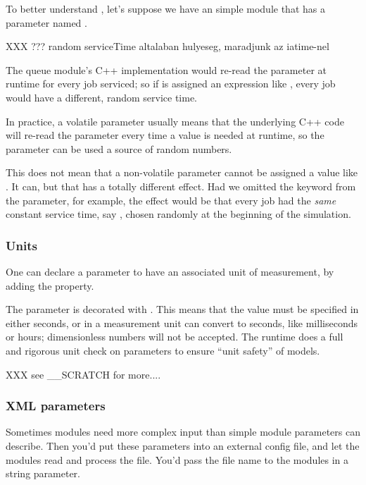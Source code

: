 To better understand , let's suppose we have an
 simple module that has a  parameter
named .

XXX ??? random serviceTime altalaban hulyeseg, maradjunk az iatime-nel

The queue module's C++ implementation would re-read the 
parameter at runtime for every job serviced; so if  is
assigned an expression like , every job would have
a different, random service time.

In practice, a volatile parameter usually means that the underlying C++
code will re-read the parameter every time a value is needed at runtime, so
the parameter can be used a source of random numbers.

\begin{note}
    This does not mean that a non-volatile parameter cannot be assigned a value
    like . It can, but that has a totally different
    effect. Had we omitted the  keyword from the
     parameter, for example, the effect would be that every
    job had the \textit{same} constant service time, say ,
    chosen randomly at the beginning of the simulation.
\end{note}

\subsubsection{Units}

One can declare a parameter to have an associated unit of measurement,
by adding the  property.

The  parameter is decorated with . This means
that the value must be specified in either seconds, or in a measurement unit {\opp}
can convert to seconds, like milliseconds or hours; dimensionless numbers
will not be accepted. The {\opp} runtime does a full and rigorous unit check on
parameters to ensure ``unit safety'' of models.

XXX see \_\_SCRATCH for more....


\subsubsection{XML parameters}

Sometimes modules need more complex input than simple module parameters
can describe. Then you'd put these parameters into an external config file,
and let the modules read and process the file. You'd pass the file name
to the modules in a string parameter.

